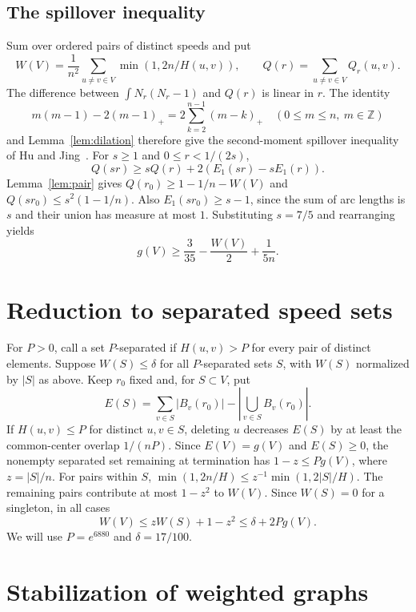 \documentclass[11pt,a4paper]{article}
\begin{document}
\subsection{The spillover inequality}

Sum over ordered pairs of distinct speeds and put
\[
 W(V)=\frac1{n^2}\sum_{u\ne v\in V}\min(1,2n/H(u,v)),\qquad
 Q(r)=\sum_{u\ne v\in V}Q_r(u,v).
\]
The difference between \(\int N_r(N_r-1)\) and \(Q(r)\) is linear
in \(r\). The identity
\[
 m(m-1)-2(m-1)_+=2\sum_{k=2}^{n-1}(m-k)_+\quad(0\le m\le n,\ m\in\mathbb Z)
\]
and Lemma~\ref{lem:dilation} therefore give the second-moment spillover
inequality of Hu and Jing~\cite{HuJing}. For \(s\ge1\) and \(0\le r<1/(2s)\),
\[
 Q(sr)\ge sQ(r)+2(E_1(sr)-sE_1(r)).
\]
Lemma~\ref{lem:pair} gives \(Q(r_0)\ge1-1/n-W(V)\) and
\(Q(sr_0)\le s^2(1-1/n)\). Also \(E_1(sr_0)\ge s-1\), since the
sum of arc lengths is \(s\) and their union has measure at most \(1\).
Substituting \(s=7/5\) and rearranging yields
\begin{equation}
 g(V)\ge\frac{3}{35}-\frac{W(V)}2+\frac1{5n}.\tag{C1}\label{eq:spill}
\end{equation}

\section{Reduction to separated speed sets}\label{sec:reduce}

For \(P>0\), call a set \(P\)-separated if \(H(u,v)>P\) for every pair
of distinct elements. Suppose \(W(S)\le\delta\) for all \(P\)-separated
sets \(S\), with \(W(S)\) normalized by \(|S|\) as above.
Keep \(r_0\) fixed and, for \(S\subset V\), put
\[
 E(S)=\sum_{v\in S}|B_v(r_0)|-
           \left|\bigcup_{v\in S}B_v(r_0)\right|.
\]
If \(H(u,v)\le P\) for distinct \(u,v\in S\), deleting \(u\) decreases
\(E(S)\) by at least the common-center overlap \(1/(nP)\).
Since \(E(V)=g(V)\) and \(E(S)\ge0\), the nonempty separated set
remaining at termination has \(1-z\le Pg(V)\), where \(z=|S|/n\).
For pairs within \(S\),
\(\min(1,2n/H)\le z^{-1}\min(1,2|S|/H)\). The remaining pairs
contribute at most \(1-z^2\) to \(W(V)\). Since \(W(S)=0\) for a
singleton, in all cases
\begin{equation}
 W(V)\le zW(S)+1-z^2\le\delta+2Pg(V).\tag{C2}\label{eq:delete}
\end{equation}
We will use \(P=e^{6880}\) and \(\delta=17/100\).

\section{Stabilization of weighted graphs}\label{sec:stable}
\end{document}
